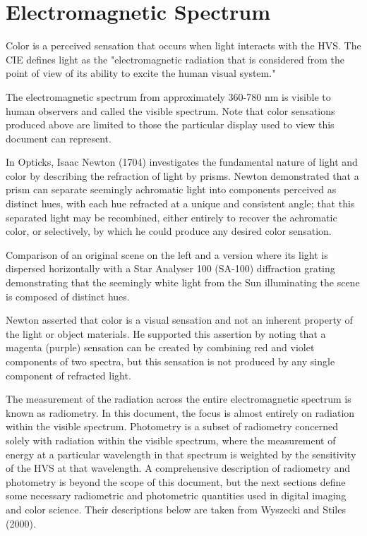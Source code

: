 \section{Electromagnetic Spectrum}%
\label{sec:electromagnetic-spectrum}

Color is a perceived sensation that occurs when light interacts with the HVS. The CIE defines light as the "electromagnetic radiation that is considered from the point of view of its ability to excite the human visual system."

The electromagnetic spectrum from approximately 360-780 nm is visible to human observers and called the visible spectrum. Note that color sensations produced above are limited to those the particular display used to view this document can represent.

In Opticks, Isaac Newton (1704) investigates the fundamental nature of light and color by describing the refraction of light by prisms. Newton demonstrated that a prism can separate seemingly achromatic light into components perceived as distinct hues, with each hue refracted at a unique and consistent angle; that this separated light may be recombined, either entirely to recover the achromatic color, or selectively, by which he could produce any desired color sensation.

Comparison of an original scene on the left and a version where its light is dispersed horizontally with a Star Analyser 100 (SA-100) diffraction grating demonstrating that the seemingly white light from the Sun illuminating the scene is composed of distinct hues.

Newton asserted that color is a visual sensation and not an inherent property of the light or object materials. He supported this assertion by noting that a magenta (purple) sensation can be created by combining red and violet components of two spectra, but this sensation is not produced by any single component of refracted light.

The measurement of the radiation across the entire electromagnetic spectrum is known as radiometry. In this document, the focus is almost entirely on radiation within the visible spectrum. Photometry is a subset of radiometry concerned solely with radiation within the visible spectrum, where the measurement of energy at a particular wavelength in that spectrum is weighted by the sensitivity of the HVS at that wavelength. A comprehensive description of radiometry and photometry is beyond the scope of this document, but the next sections define some necessary radiometric and photometric quantities used in digital imaging and color science. Their descriptions below are taken from Wyszecki and Stiles (2000).

